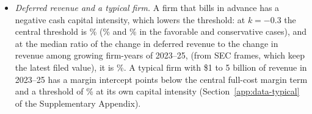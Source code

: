\begin{itemize}
\item \emph{Deferred revenue and a typical firm.} A firm that bills in advance has a negative cash capital intensity, which lowers the threshold: at $k=-0.3$ the central threshold is \GstarKdefCen\% (\GstarKdefFav\% and \GstarKdefCons\% in the favorable and conservative cases), and at the median ratio of the change in deferred revenue to the change in revenue among growing firm-years of 2023--25, \KdefMed{} (from SEC frames, which keep the latest filed value), it is \GstarKdefMedCen\%. A typical firm with \$1 to 5 billion of revenue in 2023--25 has a margin intercept \TypGapNet{} points below the central full-cost margin term and a threshold of \TypGstarK\% at its own capital intensity (Section~\ref{app:data-typical} of the Supplementary Appendix).
\end{itemize}

